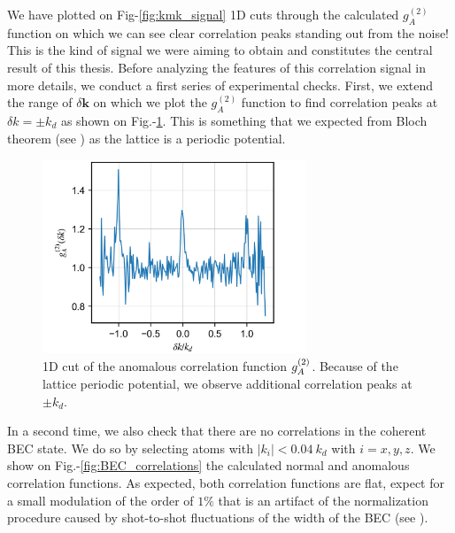 We have plotted on Fig-\ref{fig:kmk_signal} 1D cuts through the calculated $g_{A}^{(2)}$ function on which we can see clear correlation peaks standing out from the noise! This is the kind of signal we were aiming to obtain and constitutes the central result of this thesis. Before analyzing the features of this correlation signal in more details, we conduct a first series of experimental checks. First, we extend the range of $\delta \bm{k}$ on which we plot the $g_{A}^{(2)}$ function to find correlation peaks at $\delta k = \pm k_d$ as shown on Fig.-\ref{fig:periodicity}. This is something that we expected from Bloch theorem (see ) as the lattice is a periodic potential.

\begin{figure}
    \centering
    \includegraphics[width=0.7\textwidth]{Fig/Chapter4/periodicity.png}
    \caption{1D cut of the anomalous correlation function $g^{(2)}_A$. Because of the lattice periodic potential, we observe additional correlation peaks at $\pm k_d$.}
    \label{fig:periodicity}
\end{figure}

In a second time, we also check that there are no correlations in the coherent BEC state. We do so by selecting atoms with $|k_i|<0.04 \ k_d$ with $i=x,y,z$. We show on Fig.-\ref{fig:BEC_correlations} the calculated normal and anomalous correlation functions. As expected, both correlation functions are flat, expect for a small modulation of the order of $1 \%$ that is an artifact of the normalization procedure caused by shot-to-shot fluctuations of the width of the BEC (see \cite{cayla_these}).

